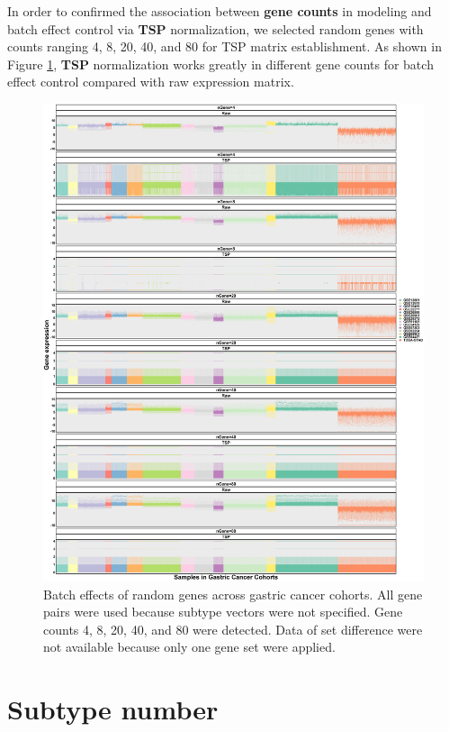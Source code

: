 \documentclass[
  12pt,
]{book}
\begin{document}
In order to confirmed the association between \textbf{gene counts} in modeling and batch effect control via \textbf{TSP} normalization, we selected random genes with counts ranging 4, 8, 20, 40, and 80 for TSP matrix establishment. As shown in Figure \ref{fig:be02}, \textbf{TSP} normalization works greatly in different gene counts for batch effect control compared with raw expression matrix.

\begin{figure}

{\centering \includegraphics[width=0.9\linewidth]{./fig/bactch-effect-02} 

}

\caption{Batch effects of random genes across gastric cancer cohorts.  All gene pairs were used because subtype vectors were not specified. Gene counts 4, 8, 20, 40, and 80 were detected. Data of set difference were not available because only one gene set were applied.}\label{fig:be02}
\end{figure}

\hypertarget{subtype-number}{%
\section{Subtype number}\label{subtype-number}}
\end{document}
